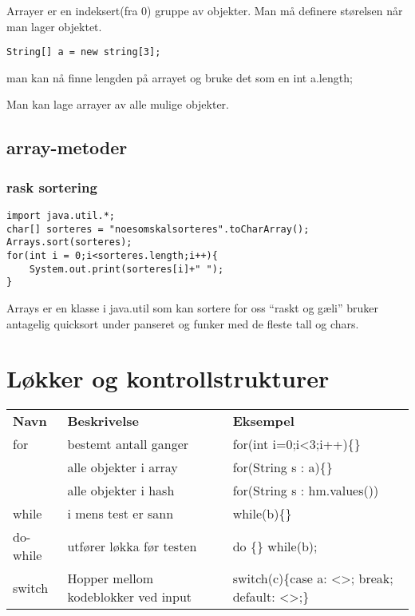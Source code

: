 \documentclass[11pt]{article}
\begin{document}
  Arrayer er en indeksert(fra 0) gruppe av objekter. Man må definere
  størelsen når man lager objektet.
\begin{verbatim}
String[] a = new string[3];
\end{verbatim}
  man kan nå finne lengden på arrayet og bruke det som en int a.length;

  Man kan lage arrayer av alle mulige objekter.
\subsection{array-metoder}
\label{sec-4_1}
\subsubsection{rask sortering}
\label{sec-4_1_1}

\begin{verbatim}
import java.util.*;
char[] sorteres = "noesomskalsorteres".toCharArray();
Arrays.sort(sorteres);
for(int i = 0;i<sorteres.length;i++){
    System.out.print(sorteres[i]+" ");
}
\end{verbatim}

Arrays er en klasse i java.util som kan sortere for oss ``raskt og gæli''
bruker antagelig quicksort under panseret og funker med de fleste tall og 
chars.
\section{Løkker og kontrollstrukturer}
\label{sec-5}



\begin{center}
\begin{tabular}{lll}
 \textbf{Navn}  &  \textbf{Beskrivelse}                 &  \textbf{Eksempel}                             \\
 for            &  bestemt antall ganger                &  for(int i=0;i<3;i++)\{\}                      \\
                &  alle objekter i array                &  for(String s : a)\{\}                         \\
                &  alle objekter i hash                 &  for(String s : hm.values())                   \\
 while          &  i mens test er sann                  &  while(b)\{\}                                  \\
 do-while       &  utfører løkka før testen             &  do \{\} while(b);                             \\
 switch         &  Hopper mellom kodeblokker ved input  &  switch(c)\{case a: <>; break; default: <>;\}  \\
\end{tabular}
\end{center}
\end{document}
